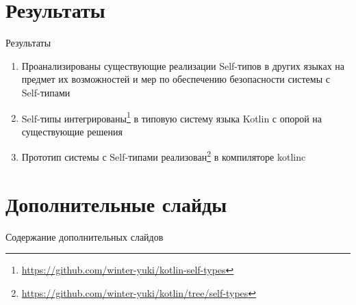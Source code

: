 \documentclass[usenames, dvipsnames]{beamer}
\begin{document}
    \section{Результаты}

    \begin{frame}{Результаты}

        \begin{enumerate}
            \item Проанализированы существующие реализации Self-типов в других языках на предмет их возможностей и мер по обеспечению безопасности системы с Self-типами
            \item Self-типы интегрированы\footnote{\url{https://github.com/winter-yuki/kotlin-self-types}} в типовую систему языка Kotlin с опорой на существующие решения
            \item Прототип системы с Self-типами реализован\footnote{\url{https://github.com/winter-yuki/kotlin/tree/self-types}} в компиляторе kotlinc
        \end{enumerate}
    \end{frame}


    \appendix


    \section*{Дополнительные слайды}

    \begin{frame}{Содержание дополнительных слайдов}
        \tableofcontents
    \end{frame}
\end{document}
